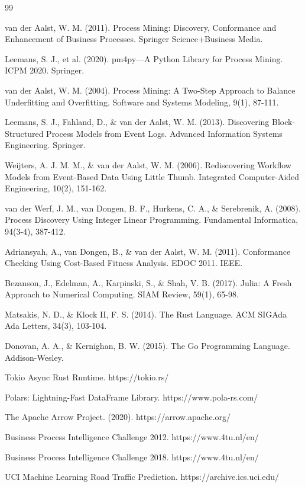 \documentclass[11pt,twocolumn]{article}
\begin{document}

\begin{thebibliography}{99}

 van der Aalst, W. M. (2011). Process Mining: Discovery, Conformance and Enhancement of Business Processes. Springer Science+Business Media.

 Leemans, S. J., et al. (2020). pm4py—A Python Library for Process Mining. ICPM 2020. Springer.

 van der Aalst, W. M. (2004). Process Mining: A Two-Step Approach to Balance Underfitting and Overfitting. Software and Systems Modeling, 9(1), 87-111.

 Leemans, S. J., Fahland, D., \& van der Aalst, W. M. (2013). Discovering Block-Structured Process Models from Event Logs. Advanced Information Systems Engineering. Springer.

 Weijters, A. J. M. M., \& van der Aalst, W. M. (2006). Rediscovering Workflow Models from Event-Based Data Using Little Thumb. Integrated Computer-Aided Engineering, 10(2), 151-162.

 van der Werf, J. M., van Dongen, B. F., Hurkens, C. A., \& Serebrenik, A. (2008). Process Discovery Using Integer Linear Programming. Fundamental Informatica, 94(3-4), 387-412.

 Adriansyah, A., van Dongen, B., \& van der Aalst, W. M. (2011). Conformance Checking Using Cost-Based Fitness Analysis. EDOC 2011. IEEE.

 Bezanson, J., Edelman, A., Karpinski, S., \& Shah, V. B. (2017). Julia: A Fresh Approach to Numerical Computing. SIAM Review, 59(1), 65-98.

 Matsakis, N. D., \& Klock II, F. S. (2014). The Rust Language. ACM SIGAda Ada Letters, 34(3), 103-104.

 Donovan, A. A., \& Kernighan, B. W. (2015). The Go Programming Language. Addison-Wesley.

 Tokio Async Rust Runtime. https://tokio.rs/

 Polars: Lightning-Fast DataFrame Library. https://www.pola-rs.com/

 The Apache Arrow Project. (2020). https://arrow.apache.org/

 Business Process Intelligence Challenge 2012. https://www.4tu.nl/en/

 Business Process Intelligence Challenge 2018. https://www.4tu.nl/en/

 UCI Machine Learning Road Traffic Prediction. https://archive.ics.uci.edu/

\end{thebibliography}
\end{document}
